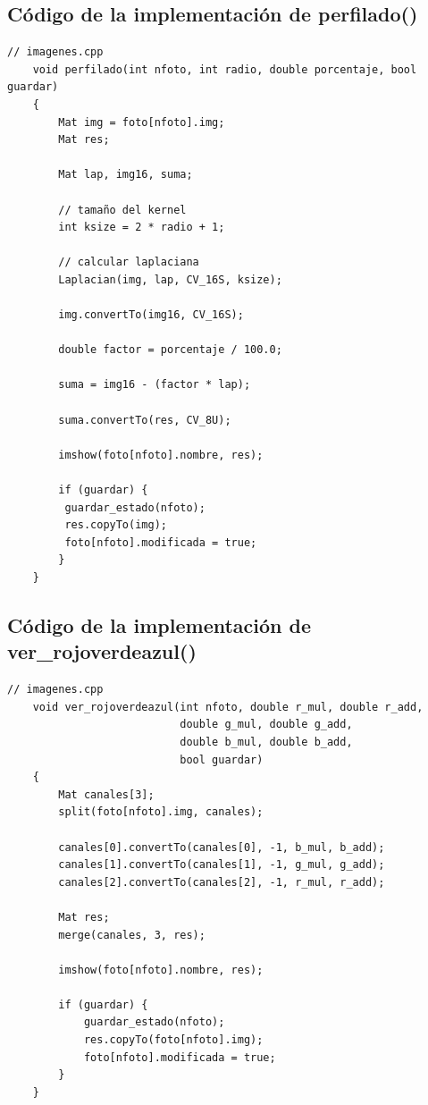 \documentclass[11pt]{article}
\begin{document}
      \clearpage

  \subsection{Código de la implementación de perfilado()}
      \label{sec:anexo-perfilado}

      \begin{lstlisting}[style=CppQtStyle, caption={Implementación de \texttt{perfilado()} en \texttt{imagenes.cpp}.}]
    // imagenes.cpp
    void perfilado(int nfoto, int radio, double porcentaje, bool guardar)
    {
        Mat img = foto[nfoto].img;
        Mat res;

        Mat lap, img16, suma;

        // tamaño del kernel
        int ksize = 2 * radio + 1;

        // calcular laplaciana
        Laplacian(img, lap, CV_16S, ksize);

        img.convertTo(img16, CV_16S);

        double factor = porcentaje / 100.0;

        suma = img16 - (factor * lap);

        suma.convertTo(res, CV_8U);

        imshow(foto[nfoto].nombre, res);

        if (guardar) {
         guardar_estado(nfoto);
         res.copyTo(img);
         foto[nfoto].modificada = true;
        }
    }
\end{lstlisting}

      \clearpage

  \subsection{Código de la implementación de ver\_rojoverdeazul()}
      \label{sec:anexo-ver-rojoverdeazul}

      \begin{lstlisting}[style=CppQtStyle, caption={Implementación de \texttt{ver\_rojoverdeazul()} en \texttt{imagenes.cpp}.}]
    // imagenes.cpp
    void ver_rojoverdeazul(int nfoto, double r_mul, double r_add,
                           double g_mul, double g_add,
                           double b_mul, double b_add,
                           bool guardar)
    {
        Mat canales[3];
        split(foto[nfoto].img, canales);

        canales[0].convertTo(canales[0], -1, b_mul, b_add);
        canales[1].convertTo(canales[1], -1, g_mul, g_add);
        canales[2].convertTo(canales[2], -1, r_mul, r_add);

        Mat res;
        merge(canales, 3, res);

        imshow(foto[nfoto].nombre, res);

        if (guardar) {
            guardar_estado(nfoto);
            res.copyTo(foto[nfoto].img);
            foto[nfoto].modificada = true;
        }
    }
\end{lstlisting}
\end{document}
